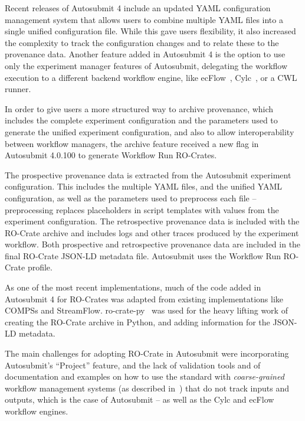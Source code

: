 \documentclass[10pt,letterpaper]{article}
\begin{document}
Recent releases of Autosubmit 4 include an updated YAML configuration management system that allows users to combine multiple YAML files into a single unified configuration file.
While this gave users flexibility, it also increased the complexity to track the configuration changes and to relate these to the provenance data.
Another feature added in Autosubmit 4 is the option to use only the experiment manager features of Autosubmit, delegating the workflow execution to a different backend workflow engine, like ecFlow~\cite{Bahra 2011}, Cylc~\cite{Oliver 2019}, or a CWL runner.

In order to give users a more structured way to archive provenance, which includes the complete experiment configuration and the parameters used to generate the unified experiment configuration, and also to allow interoperability between workflow managers, the archive feature received a new flag in Autosubmit 4.0.100 \cite{Beltrán 2023} to generate Workflow Run RO-Crates.

The prospective provenance data is extracted from the Autosubmit experiment configuration.
This includes the multiple YAML files, and the unified YAML configuration, as well as the parameters used to preprocess each file -- preprocessing replaces placeholders in script templates with values from the experiment configuration.
The retrospective provenance data is included with the RO-Crate archive and includes logs and other traces produced by the experiment workflow.
Both prospective and retrospective provenance data are included in the final RO-Crate JSON-LD metadata file. Autosubmit uses the Workflow Run RO-Crate profile.

As one of the most recent implementations, much of the code added in Autosubmit 4 for RO-Crates was adapted from existing implementations like COMPSs and StreamFlow.
ro-crate-py~\cite{ro-crate-py} was used for the heavy lifting work of creating the RO-Crate archive in Python, and adding information for the JSON-LD metadata.

The main challenges for adopting RO-Crate in Autosubmit were incorporating Autosubmit's ``Project'' feature, and the lack of validation tools and of documentation and examples on how to use the standard with \emph{coarse-grained} workflow management systems (as described in~\cite{Goble 2020}) that do not track inputs and outputs, which is the case of Autosubmit -- as well as the Cylc and ecFlow workflow engines.
\end{document}
